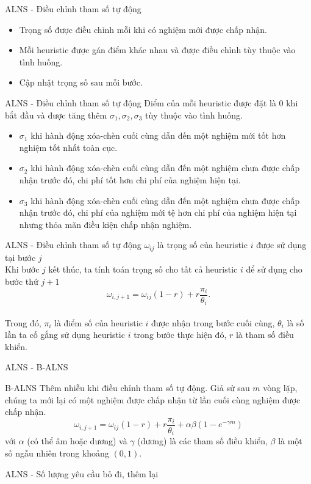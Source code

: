 \begin{frame}{ALNS - Điều chỉnh tham số tự động}
  \begin{itemize}
    \item Trọng số được điều chỉnh mỗi khi có nghiệm mới được chấp nhận.
    \item Mỗi heuristic được gán điểm khác nhau và được điều chỉnh tùy thuộc vào tình huống.
    \item Cập nhật trọng số sau mỗi bước.
  \end{itemize}
\end{frame}

\begin{frame}{ALNS - Điều chỉnh tham số tự động}
  Điểm của mỗi heuristic được đặt là $0$ khi bắt đầu và được tăng thêm $\sigma_1, \sigma_2, \sigma_3$ tùy thuộc vào tình huống.
  \begin{itemize}
    \justifying
    \item $\sigma_1$ khi hành động xóa-chèn cuối cùng dẫn đến một nghiệm mới tốt hơn nghiệm tốt nhất toàn cục.
    \item $\sigma_2$ khi hành động xóa-chèn cuối cùng dẫn đến một nghiệm chưa được chấp nhận trước đó, chi phí tốt hơn chi phí của nghiệm hiện tại.
    \item $\sigma_3$ khi hành động xóa-chèn cuối cùng dẫn đến một nghiệm chưa được chấp nhận trước đó, chi phí của nghiệm mới tệ hơn chi phí của nghiệm hiện tại nhưng thỏa mãn điều kiện chấp nhận nghiệm.
  \end{itemize}
\end{frame}

\begin{frame}{ALNS - Điều chỉnh tham số tự động}
  $\omega_{ij}$ là trọng số của heuristic $i$ được sử dụng tại bước $j$ \\
  Khi bước $j$ kết thúc, ta tính toán trọng số cho tất cả heuristic $i$ để sử dụng cho bước thứ $j + 1$
  \begin{equation}
      \omega_{i, j+1} = \omega_{ij}(1-r)+r\frac{\pi_i}{\theta_i}.
  \end{equation} \\
  Trong đó, $\pi_i$ là điểm số của heuristic $i$ được nhận trong bước cuối cùng, $\theta_i$ là số lần ta cố gắng sử dụng heuristic $i$ trong bước thực hiện đó, $r$ là tham số điều khiển.
\end{frame}

\begin{frame}{ALNS - B-ALNS}
  \begin{block}{B-ALNS}
    Thêm nhiễu khi điều chỉnh tham số tự động. Giả sử sau $m$ vòng lặp, chúng ta mới lại có một nghiệm được chấp nhận từ lần cuối cùng nghiệm được chấp nhận.
    \begin{equation}
      \label{eq:boost_adaptive_weight}
      \omega_{i, j+1} = \omega_{ij}(1-r)+r\frac{\pi_i} {\theta_i} + \alpha \beta (1 - e^{-\gamma m})
    \end{equation}
    với $\alpha$ (có thể âm hoặc dương) và $\gamma$ (dương) là các tham số điều khiển, $\beta$ là một số ngẫu nhiên trong khoảng $(0,1)$.
  \end{block}
\end{frame}

\begin{frame}{ALNS - Số lượng yêu cầu bỏ đi, thêm lại}
  
\end{frame}

